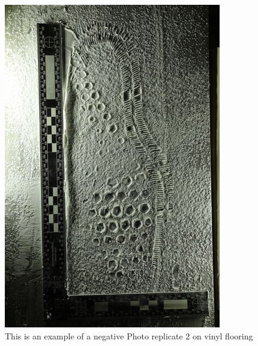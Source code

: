 \begin{figure}[!htp]
\centering
\includegraphics[scale=1.8, angle=180]{Vinyl2.png}
\caption{This is an example of a negative Photo replicate 2 on vinyl flooring}
\label{Figure 6}
\end{figure}

